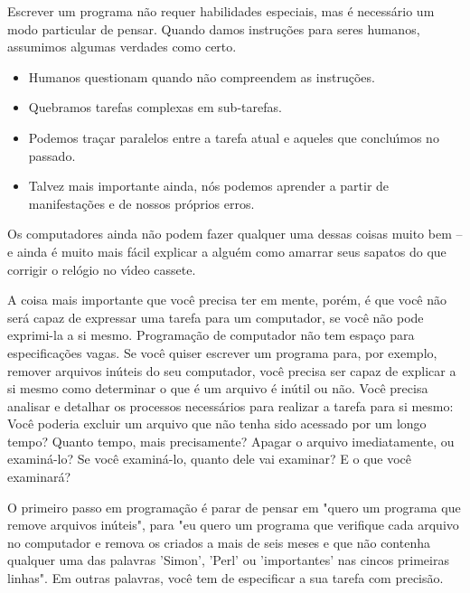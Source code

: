 \documentclass[a4paper,12pt,twoside]{book}
\begin{document}
  \noindent Escrever um programa n\~ao requer habilidades especiais, mas \'e necess\'ario 
  um modo particular de pensar. Quando damos instru\c{c}\~oes para seres humanos, assumimos 
  algumas verdades como certo.

  \begin{itemize}

    \item Humanos questionam quando n\~ao compreendem as instru\c{c}\~oes.

    \item Quebramos tarefas complexas em sub-tarefas.

    \item Podemos tra\c{c}ar paralelos entre a tarefa atual e aqueles que conclu\'{\i}mos no passado.

    \item Talvez mais importante ainda, n\'os podemos aprender a partir de manifesta\c{c}\~oes e de nossos pr\'oprios erros.

  \end{itemize} 

  \noindent Os computadores ainda n\~ao podem fazer qualquer uma dessas coisas 
  muito bem – e ainda \'e muito mais f\'acil explicar a algu\'em como amarrar 
  seus sapatos do que corrigir o rel\'ogio no v\'{\i}deo cassete.\medskip

  \noindent A coisa mais importante que voc\^e precisa ter em mente, por\'em, 
  \'e que voc\^e n\~ao ser\'a capaz de expressar uma tarefa para um computador, 
  se voc\^e n\~ao pode exprimi-la a si mesmo. Programa\c{c}\~ao de computador 
  n\~ao tem espa\c{c}o para especifica\c{c}\~oes vagas. Se voc\^e quiser escrever 
  um programa para, por exemplo, remover arquivos in\'uteis do seu computador, 
  voc\^e precisa ser capaz de explicar a si mesmo como determinar o que \'e um 
  arquivo \'e in\'util ou n\~ao. Voc\^e precisa analisar e detalhar os processos 
  necess\'arios para realizar a tarefa para si mesmo: Voc\^e poderia excluir um 
  arquivo que n\~ao tenha sido acessado por um longo tempo? Quanto tempo, mais 
  precisamente? Apagar o arquivo imediatamente, ou examin\'a-lo? Se voc\^e examin\'a-lo, 
  quanto dele vai examinar? E o que voc\^e examinar\'a?\medskip

\noindent O primeiro passo em programa\c{c}\~ao \'e parar de pensar em "quero um programa 
que remove arquivos in\'uteis", para "eu quero um programa que verifique cada arquivo no 
computador e remova os criados a mais de seis meses e que n\~ao contenha qualquer uma das 
palavras 'Simon', 'Perl' ou 'importantes' nas cincos primeiras linhas". Em outras palavras, 
voc\^e tem de especificar a sua tarefa com precis\~ao.\medskip
\end{document}
